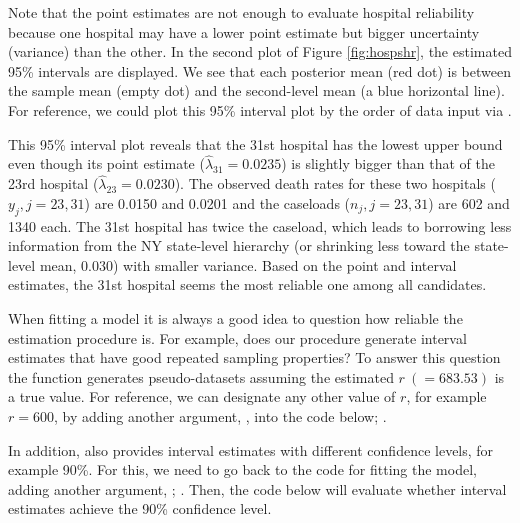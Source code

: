 \documentclass[article]{jss}
\begin{document}
Note that the point estimates are not enough to evaluate hospital reliability because one hospital may have a lower point estimate but  bigger uncertainty (variance) than the other. In the second plot of Figure \ref{fig:hospshr}, the estimated 95\% intervals are displayed. We see that each posterior mean (red dot) is between the sample mean (empty dot) and the second-level mean (a blue horizontal line). For reference, we could plot this 95\% interval plot by the order of data input via .

This 95\% interval plot reveals that the 31st hospital has the lowest upper bound even though its point estimate ($\hat{\lambda}_{31}=0.0235$) is slightly bigger than that of the 23rd hospital ($\hat{\lambda}_{23}=0.0230$). The observed death rates for these two hospitals ($y_{j}, j=23, 31$) are 0.0150 and 0.0201 and the caseloads ($n_{j}, j =23, 31$) are 602 and 1340 each. The 31st hospital has twice the caseload, which leads to borrowing less information from the NY state-level hierarchy (or shrinking less toward the state-level mean, 0.030) with smaller variance. Based on the point and interval estimates, the 31st hospital seems the most reliable one among all candidates. 


When fitting a model it is always a good idea to question how reliable the estimation procedure is. For example, does our procedure generate interval estimates that have good repeated sampling properties? To answer this question the  function generates pseudo-datasets assuming the estimated $r~(=683.53)$ is a true value. For reference, we can designate any other value of $r$, for example $r=600$, by adding another argument, , into the code below; .


In addition,  also provides interval estimates with different confidence levels, for example 90\%. For this, we need to go back to the code for fitting the model, adding another argument, ; .  Then, the code below will evaluate whether interval estimates achieve the 90\% confidence level.
\end{document}
